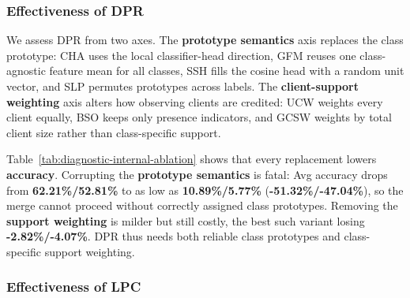 \documentclass[letterpaper]{article} %
\begin{document}
\subsubsection{Effectiveness of DPR}
We assess DPR from two axes. The \textbf{prototype semantics} axis replaces the class prototype: CHA uses the local classifier-head direction, GFM reuses one class-agnostic feature mean for all classes, SSH fills the cosine head with a random unit vector, and SLP permutes prototypes across labels. The \textbf{client-support weighting} axis alters how observing clients are credited: UCW weights every client equally, BSO keeps only presence indicators, and GCSW weights by total client size rather than class-specific support.

Table~\ref{tab:diagnostic-internal-ablation} shows that every replacement lowers \textbf{accuracy}. Corrupting the \textbf{prototype semantics} is fatal: Avg accuracy drops from \textbf{62.21\%/52.81\%} to as low as \textbf{10.89\%/5.77\%} (\textbf{\textcolor{DropRed}{-51.32\%/-47.04\%}}), so the merge cannot proceed without correctly assigned class prototypes. Removing the \textbf{support weighting} is milder but still costly, the best such variant losing \textbf{\textcolor{DropRed}{-2.82\%/-4.07\%}}. DPR thus needs both reliable class prototypes and class-specific support weighting.

\subsubsection{Effectiveness of LPC}
\end{document}
